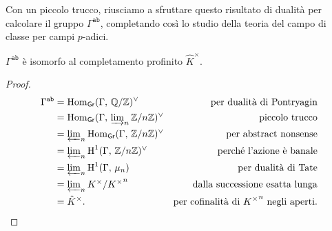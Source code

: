 Con un piccolo trucco, riusciamo a sfruttare questo risultato di dualità per calcolare il gruppo $ \Gamma^\texttt{ab} $, completando così lo studio della teoria del campo di classe per campi $ p $-adici.

\begin{theorem}
	$ \Gamma^\mathtt{ab} $ è isomorfo al completamento profinito $ \hat{K}^\times $.
\end{theorem}
\begin{proof}
	\begin{align*}
	\Gamma^\mathtt{ab}
	& = \operatorname{Hom}_\mathsf{Gr}(\Gamma,\, \mathbb{Q}/\mathbb{Z})^\vee & \text{per dualità di Pontryagin} \\[0.1em]
	& = \operatorname{Hom}_\mathsf{Gr}(\Gamma,\, \textstyle\varinjlim_n \mathbb{Z}/n\mathbb{Z})^\vee & \text{piccolo trucco}\\ 
	& = \textstyle\varprojlim_n \operatorname{Hom}_\mathsf{Gr}(\Gamma,\, \mathbb{Z}/n\mathbb{Z})^\vee & \text{per abstract nonsense} \\
	& = \textstyle\varprojlim_n \operatorname{H}^1(\Gamma,\, \mathbb{Z}/n\mathbb{Z})^\vee & \text{perché l'azione è banale} \\
	& = \textstyle\varprojlim_n \operatorname{H}^1(\Gamma,\, \mu_n) & \text{per dualità di Tate} \\
	& = \textstyle\varprojlim_n K^\times / {K^\times}^n & \text{dalla successione esatta lunga} \\
	& = \hat{K}^\times. & \text{per cofinalità di } {K^\times}^n \text{ negli aperti.}
	\end{align*}
\end{proof}

